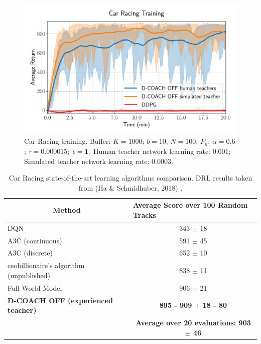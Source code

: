 \begin{figure}[h]
    \centering
    \includegraphics[width=0.7\linewidth]{imagenes/cap3/offline_car_racing_humans.pdf}
    \caption[Car Racing training.]{Car Racing training. Buffer: $K = 1000$; $b = 10$; $N = 100$. $P_{h}$: $\alpha = 0.6$; $\tau = 0.000015$; $\emph{e}=\textbf{1}$. Human teacher network learning rate: $0.001$; Simulated teacher network learning rate: $0.0003$.}
    \label{fig:racing_car_results1}
\end{figure}

\begin{table}[h]
\centering
\caption[Car Racing state-of-the-art learning algorithms comparison.]{Car Racing state-of-the-art learning algorithms comparison. DRL results taken from (Ha \& Schmidhuber, 2018) \cite{Ha2018}.}
\label{CarRacing_table}
\begin{tabular}{lc}
\multicolumn{1}{c}{\textbf{Method}}      & \multicolumn{1}{l}{\textbf{Average Score over 100 Random Tracks}} \\ \hline\hline
DQN                                      & 343 $\pm$ 18                                                      \\ \hline
A3C (continuous)                         & 591 $\pm$ 45                                                      \\ \hline
A3C (discrete)                           & 652 $\pm$ 10                                                      \\ \hline
ceobillionaire’s algorithm (unpublished) & 838 $\pm$ 11                                                      \\ \hline
Full World Model                         & 906 $\pm$ 21                                                      \\ \hline
\textbf{D-COACH OFF (experienced teacher)}                         & \textbf{895 - 909 $\pm$ 18 - 80} \\
& \textbf{Average over 20 evaluations: 903 $\pm$ 46}
\\ \hline
\end{tabular}
\end{table}

